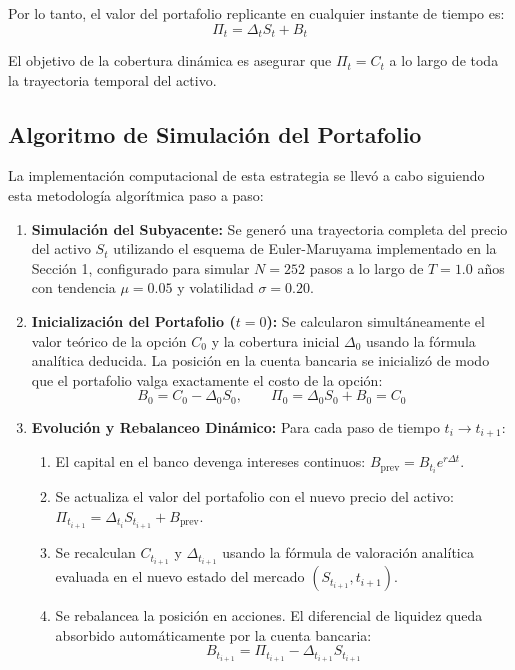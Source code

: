 \documentclass[12pt, a4paper]{article}
\begin{document}
Por lo tanto, el valor del portafolio replicante en cualquier instante de tiempo es:
\begin{equation}
    \Pi_t = \Delta_t S_t + B_t
\end{equation}

El objetivo de la cobertura dinámica es asegurar que $\Pi_t = C_t$ a lo largo de toda la trayectoria temporal del activo.

\subsection{Algoritmo de Simulación del Portafolio}

La implementación computacional de esta estrategia se llevó a cabo siguiendo esta metodología algorítmica paso a paso:

\begin{enumerate}
    \item \textbf{Simulación del Subyacente:} Se generó una trayectoria completa del precio del activo $S_t$ utilizando el esquema de Euler-Maruyama implementado en la Sección 1, configurado para simular $N = 252$ pasos a lo largo de $T = 1.0$ años con tendencia $\mu = 0.05$ y volatilidad $\sigma = 0.20$.

    \item \textbf{Inicialización del Portafolio ($t = 0$):} Se calcularon simultáneamente el valor teórico de la opción $C_0$ y la cobertura inicial $\Delta_0$ usando la fórmula analítica deducida. La posición en la cuenta bancaria se inicializó de modo que el portafolio valga exactamente el costo de la opción:
    \begin{equation}
        B_0 = C_0 - \Delta_0 S_0, \qquad \Pi_0 = \Delta_0 S_0 + B_0 = C_0
    \end{equation}

    \item \textbf{Evolución y Rebalanceo Dinámico:} Para cada paso de tiempo $t_{i} \to t_{i+1}$:
    \begin{enumerate}
        \item El capital en el banco devenga intereses continuos: $B_{\text{prev}} = B_{t_i} e^{r \Delta t}$.
        \item Se actualiza el valor del portafolio con el nuevo precio del activo: $\Pi_{t_{i+1}} = \Delta_{t_i} S_{t_{i+1}} + B_{\text{prev}}$.
        \item Se recalculan $C_{t_{i+1}}$ y $\Delta_{t_{i+1}}$ usando la fórmula de valoración analítica evaluada en el nuevo estado del mercado $(S_{t_{i+1}}, t_{i+1})$.
        \item Se rebalancea la posición en acciones. El diferencial de liquidez queda absorbido automáticamente por la cuenta bancaria:
        \begin{equation}
            B_{t_{i+1}} = \Pi_{t_{i+1}} - \Delta_{t_{i+1}} S_{t_{i+1}}
        \end{equation}
    \end{enumerate}


\end{enumerate}
\end{document}

